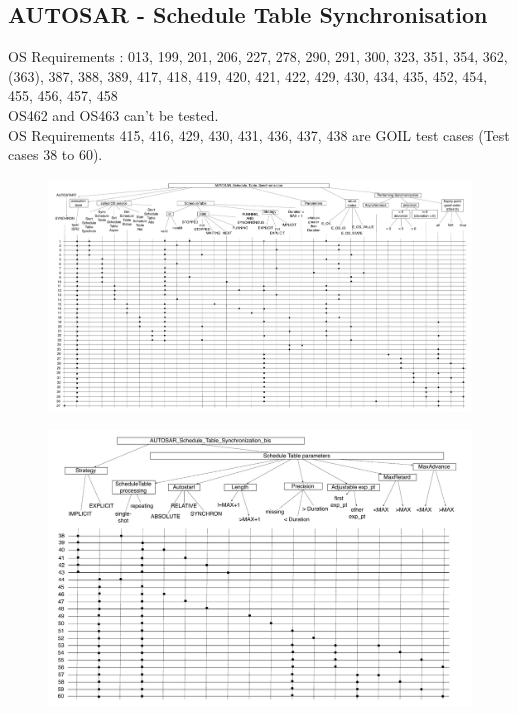 \documentclass[10pt]{article}
\begin{document}
	\subsection{AUTOSAR - Schedule Table Synchronisation}
	OS Requirements : 013, 199, 201, 206, 227, 278, 290, 291, 300, 323, 351, 354, 362, (363), 387, 388, 389, 417, 418, 419, 420, 421, 422, 429, 430, 434, 435, 452, 454, 455, 456, 457, 458 \\
	OS462 and OS463 can't be tested. \\
	OS Requirements  415, 416, 429, 430, 431, 436, 437, 438 are GOIL test cases (Test cases 38 to 60).\\
	
	\begin{figure}[htbp] %
  		\centering
		\includegraphics[width=1\textheight, angle=90]{graphics/AUTOSAR_Schedule_Table_Synchronization.pdf}
	\end{figure}
	
	\begin{figure}[htbp] %
  		\centering
		\includegraphics[width=1\textwidth]{graphics/AUTOSAR_Schedule_Table_Synchronization_bis.pdf}
	\end{figure}
	
\end{document}
